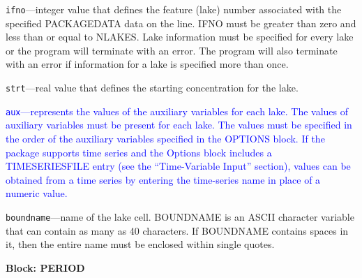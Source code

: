 \begin{description}
\item \texttt{ifno}---integer value that defines the feature (lake) number associated with the specified PACKAGEDATA data on the line. IFNO must be greater than zero and less than or equal to NLAKES. Lake information must be specified for every lake or the program will terminate with an error.  The program will also terminate with an error if information for a lake is specified more than once.

\item \texttt{strt}---real value that defines the starting concentration for the lake.

\item \textcolor{blue}{\texttt{aux}---represents the values of the auxiliary variables for each lake. The values of auxiliary variables must be present for each lake. The values must be specified in the order of the auxiliary variables specified in the OPTIONS block.  If the package supports time series and the Options block includes a TIMESERIESFILE entry (see the ``Time-Variable Input'' section), values can be obtained from a time series by entering the time-series name in place of a numeric value.}

\item \texttt{boundname}---name of the lake cell.  BOUNDNAME is an ASCII character variable that can contain as many as 40 characters.  If BOUNDNAME contains spaces in it, then the entire name must be enclosed within single quotes.

\end{description}
\item \textbf{Block: PERIOD}


